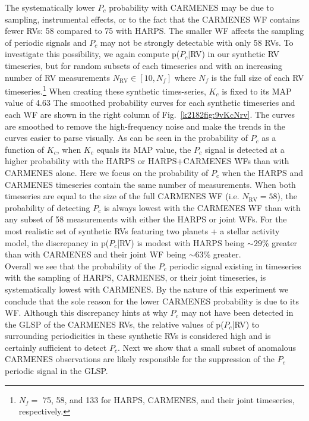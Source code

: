 The systematically lower $P_c$ probability with CARMENES may be due to sampling, instrumental effects, or to the fact
that the CARMENES WF contains fewer RVs: 58 compared to 75
with HARPS. The smaller WF affects the sampling of periodic signals and $P_c$ may not be strongly
detectable with only 58 RVs.
To investigate this possibility, we again compute p($P_c|$RV) in our synthetic RV timeseries, but for
random subsets  of each timeseries and with an increasing number of RV measurements 
$N_{\text{RV}} \in [10,N_f]$ where $N_f$ is the full size
of each RV timeseries.\footnote{$N_f =$ 75, 58, and 133 for HARPS, CARMENES, and their joint timeseries,
  respectively.} When creating these synthetic times-series, $K_c$ is fixed to its MAP value of 4.63 
The smoothed probability curves for each synthetic timeseries and each WF are shown in the right
column of Fig.~\ref{k2182fig:9vKcNrv}. The curves are smoothed to remove the  high-frequency noise and make the trends in the
curves easier to parse visually. As can be seen in the probability of $P_c$ as a function of $K_c$, when $K_c$ equals
its MAP value, the $P_c$ signal is detected at a higher probability with the HARPS or HARPS+CARMENES
WFs than with CARMENES alone. Here we focus on the probability of $P_c$ when the HARPS and CARMENES timeseries
contain the same number of measurements.
When both timeseries are equal to the size of the full CARMENES WF (i.e. $N_{\text{RV}}=58$), the
probability of detecting $P_c$ is always lowest with the CARMENES WF than with any subset of 58 measurements with
either the HARPS or joint WFs. For the most realistic set of synthetic RVs featuring two planets + a stellar activity
model, the discrepancy in p($P_c$|RV) is modest with HARPS being $\sim 29$\% greater than with CARMENES and
their joint WF being $\sim 63$\% greater. \\

Overall we see that the probability of the $P_c$ periodic signal existing in timeseries with the sampling of HARPS,
CARMENES, or their joint timeseries, is systematically lowest with CARMENES. By the nature of this experiment we
conclude that the sole reason for the  lower CARMENES probability is due to its WF. Although this discrepancy hints
at why  $P_c$ may not have been detected in the GLSP of the CARMENES RVs, the relative values of p($P_c$|RV) to
surrounding periodicities in these synthetic RVs is considered high and is certainly sufficient to detect $P_c$.
Next we show that a small subset of anomalous CARMENES observations are likely responsible for the suppression
of the $P_c$ periodic signal in the GLSP.

